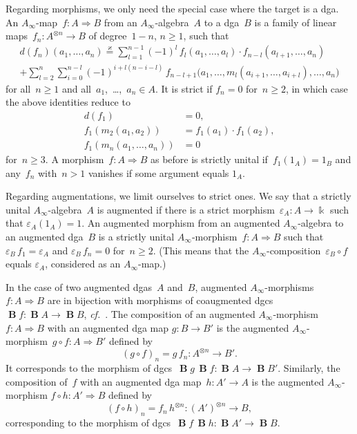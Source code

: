 \documentclass[letterpaper]{amsart}
\numberwithin{equation}{section}
\theoremstyle{plain}
\theoremstyle{definition}
\theoremstyle{remark}
\def\cf{\emph{cf.}}
\let\epsilon\varepsilon
\def\Ainf{A_{\infty}}
\DeclareMathOperator{\BB}{\mathbf{B}}
\def\kk{\Bbbk}
\let\KS\varkappa
\def\eqKS{\stackrel{\KS}{=}}
\begin{document}
Regarding morphisms, we only need the special case where the target is a dga.
An $\Ainf$-map~$f\colon A\Rightarrow B$ from an $\Ainf$-algebra~$A$ to a dga~$B$
is a family of linear maps~$f_{n}\colon A^{\otimes n}\to B$ of degree~$1-n$, $n\ge1$, such that
\begin{multline}
  \label{eq:def-ainf-map}
  d(f_{n})(a_{1},\dots,a_{n}) \eqKS
  \sum_{l=1}^{n-1} (-1)^{l}\,f_{l}(a_{1},\dots,a_{l})\cdot f_{n-l}(a_{l+1},\dots,a_{n}) \\
  + \sum_{l=2}^{n}\sum_{i=0}^{n-l} (-1)^{i+l(n-i-l)}\,f_{n-l+1}\bigl(a_{1},\dots,m_{l}(a_{i+1},\dots,a_{i+l}),\dots,a_{n}\bigr)
\end{multline}
for all~$n\ge1$ and all~$a_{1}$,~\dots,~$a_{n}\in A$.
It is strict if $f_{n}=0$ for~$n\ge2$, in which case the above identities reduce to
\begin{align}
  d(f_{1}) &= 0, \\
  f_{1}(m_{2}(a_{1},a_{2})) &= f_{1}(a_{1})\cdot f_{1}(a_{2}), \\
  f_{1}(m_{n}(a_{1},\dots,a_{n})) &= 0
\end{align}
for~$n\ge3$.
A morphism~$f\colon A\Rightarrow B$ as before is strictly unital
if~$f_{1}(1_{A})=1_{B}$ and any~$f_{n}$ with~$n>1$ vanishes if some argument equals $1_{A}$.

Regarding augmentations, we limit ourselves to strict ones.
We say that a strictly unital $\Ainf$-algebra~$A$ is augmented
if there is a strict morphism~$\epsilon_{A}\colon A\to\kk$ such that $\epsilon_{A}(1_{A})=1$.
An augmented morphism from an augmented $\Ainf$-algebra to an augmented dga~$B$
is a strictly unital $\Ainf$-morphism~$f\colon A\Rightarrow B$ such that
$\epsilon_{B}\,f_{1}=\epsilon_{A}$ and $\epsilon_{B}\,f_{n}=0$ for~$n\ge2$.
(This means that the $\Ainf$-composition~$\epsilon_{B}\circ f$ equals $\epsilon_{A}$, considered as an $\Ainf$-map.)

In the case of two augmented dgas~$A$ and~$B$,
augmented $\Ainf$-morphisms~$f\colon A\Rightarrow B$
are in bijection with morphisms of coaugmented dgcs~$\BB f\colon \BB A\to\BB B$, \cf~\cite[Sec.~3.6]{Keller:2001}.
The composition of an augmented $\Ainf$-morphism~$f\colon A\Rightarrow B$ with an augmented dga map $g\colon B\to B'$
is the augmented $\Ainf$-morphism~$g\circ f\colon A\Rightarrow B'$ defined by
\begin{equation}
  (g\circ f)_{n} = g\,f_{n}\colon A^{\otimes n}\to B'.
\end{equation}
It corresponds to the morphism of dgcs~$\BB g\,\BB f\colon \BB A\to \BB B'$.
Similarly, the composition of~$f$ with an augmented dga map~$h\colon A'\to A$
is the augmented $\Ainf$-morphism $f\circ h\colon A'\Rightarrow B$ defined by
\begin{equation}
  (f\circ h)_{n} = f_{n}\,h^{\otimes n}\colon (A')^{\otimes n}\to B,
\end{equation}
corresponding to the morphism of dgcs~$\BB f\,\BB h\colon \BB A'\to \BB B.$
\end{document}
